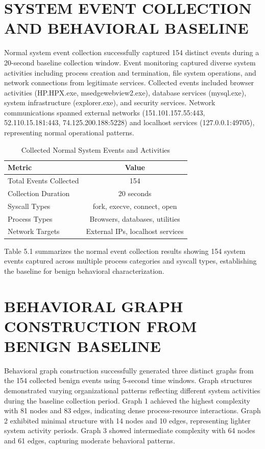 \section{SYSTEM EVENT COLLECTION AND BEHAVIORAL BASELINE}

Normal system event collection successfully captured 154 distinct events during a 20-second baseline collection window. Event monitoring captured diverse system activities including process creation and termination, file system operations, and network connections from legitimate services. Collected events included browser activities (HP.HPX.exe, msedgewebview2.exe), database services (mysql.exe), system infrastructure (explorer.exe), and security services. Network communications spanned external networks (151.101.157.55:443, 52.110.15.181:443, 74.125.200.188:5228) and localhost services (127.0.0.1:49705), representing normal operational patterns.

\begin{table}[h]
\centering
\caption{Collected Normal System Events and Activities}
\label{tab:event_collection_stats}
\begin{tabular}{|l|c|}
\hline
\textbf{Metric} & \textbf{Value} \\ \hline
Total Events Collected & 154 \\ \hline
Collection Duration & 20 seconds \\ \hline
Syscall Types & fork, execve, connect, open \\ \hline
Process Types & Browsers, databases, utilities \\ \hline
Network Targets & External IPs, localhost services \\ \hline
\end{tabular}
\end{table}

Table 5.1 summarizes the normal event collection results showing 154 system events captured across multiple process categories and syscall types, establishing the baseline for benign behavioral characterization.

\vspace{0.3cm}

\section{BEHAVIORAL GRAPH CONSTRUCTION FROM BENIGN BASELINE}

Behavioral graph construction successfully generated three distinct graphs from the 154 collected benign events using 5-second time windows. Graph structures demonstrated varying organizational patterns reflecting different system activities during the baseline collection period. Graph 1 achieved the highest complexity with 81 nodes and 83 edges, indicating dense process-resource interactions. Graph 2 exhibited minimal structure with 14 nodes and 10 edges, representing lighter system activity periods. Graph 3 showed intermediate complexity with 64 nodes and 61 edges, capturing moderate behavioral patterns.

